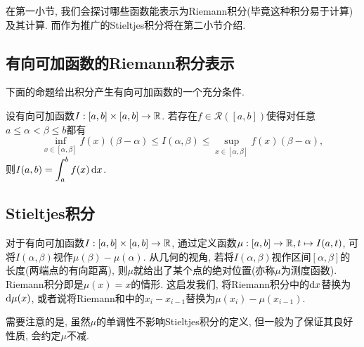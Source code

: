在第一小节, 我们会探讨哪些函数能表示为Riemann积分(毕竟这种积分易于计算)及其计算. 而作为推广的Stieltjes积分将在第二小节介绍. 

\subsection{有向可加函数的Riemann积分表示}

下面的命题给出积分产生有向可加函数的一个充分条件. 

\begin{proposition}{}
	设有向可加函数$I:[a,b] \times [a,b] \to \mathbb{R}$. 若存在$f \in \mathcal{R}([a,b])$使得对任意$a \leq \alpha < \beta \leq b$都有$$\inf_{x\in [\alpha ,\beta]} f(x) (\beta -\alpha) \leq I(\alpha ,\beta) \leq \sup_{x\in [\alpha ,\beta]} f(x) (\beta -\alpha),$$
	则$\displaystyle I(a,b)=\int_a^b f(x) \mathop{}\!\mathrm{d} x$. 
\end{proposition}

\subsection{Stieltjes积分}

对于有向可加函数$I:[a,b] \times [a,b] \to \mathbb{R}$, 通过定义函数$\mu :[a,b] \to \mathbb{R} ,t \mapsto I(a,t)$, 可将$I(\alpha ,\beta)$视作$\mu (\beta)-\mu (\alpha)$. 从几何的视角, 若将$I(\alpha ,\beta)$视作区间$[\alpha ,\beta ]$的长度(两端点的有向距离), 则$\mu$就给出了某个点的绝对位置(亦称$\mu$为测度函数). Riemann积分即是$\mu (x)=x$的情形. 这启发我们, 将Riemann积分中的$\mathop{}\!\mathrm{d} x$替换为$\mathop{}\!\mathrm{d} \mu (x)$, 或者说将Riemann和中的$x_i-x_{i-1}$替换为$\mu (x_i)- \mu (x_{i-1})$. 

需要注意的是, 虽然$\mu $的单调性不影响Stieltjes积分的定义, 但一般为了保证其良好性质, 会约定$\mu$不减. 

